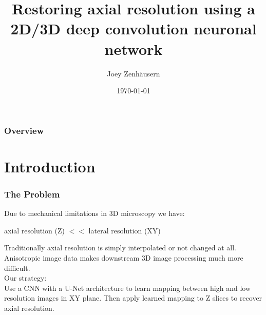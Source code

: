 \documentclass{beamer}
\title[Restore axial resolution CNN]{Restoring axial resolution using a 2D/3D deep convolution neuronal network} %
\author{Joey Zenhäusern} %
\institute[EPFL] %
{
    \small{
        Section of Computer Science \\
        École Polytechnique Fédérale de Lausanne \\ %
        Semester Project -- 12 Credits \\
    }

    \medskip
    Supervision: \\
    Dr. Daniel Sage\\
    Dr. Kyong Jin
}
\date{\today} %
\begin{document}
\begin{frame}
    \titlepage %
\end{frame}

\begin{frame}
    \frametitle{Overview} %
    \tableofcontents %
\end{frame}


\section{Introduction} %
\begin{frame}
    \frametitle{The Problem}
    Due to mechanical limitations in 3D microscopy we have:\\
    \vspace{5pt}
    \begin{center}
        axial resolution (Z) $<<$ lateral resolution (XY)\\
    \end{center}
    \vspace{5pt}
    Traditionally axial resolution is simply interpolated or not changed at all. Anisotropic image data makes downstream 3D image processing much more difficult.\\
    \vspace{10pt}
    Our strategy:\\
    Use a CNN with a U-Net architecture to learn mapping between high and low resolution
    images in XY plane. Then apply learned mapping to Z slices to recover axial resolution.
\end{frame}
\end{document}
